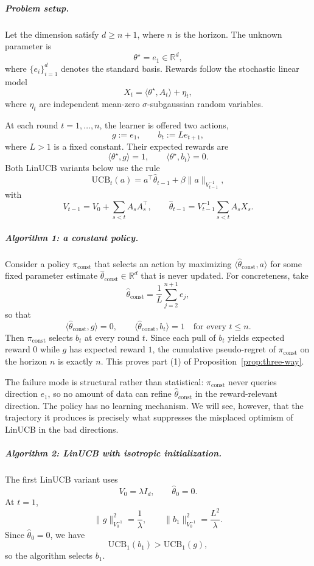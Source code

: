 \documentclass{article}
\theoremstyle{definition}
\theoremstyle{remark}
\theoremstyle{remark}
\begin{document}
\subparagraph{Problem setup.}
Let the dimension satisfy $d \ge n+1$, where $n$ is the horizon. The unknown parameter is
\[
\theta^\star = e_1 \in \mathbb{R}^d,
\]
where $\{e_i\}_{i=1}^d$ denotes the standard basis. Rewards follow the stochastic linear model
\[
X_t = \langle \theta^\star, A_t \rangle + \eta_t,
\]
where $\eta_t$ are independent mean-zero $\sigma$-subgaussian random variables.

At each round $t=1,\dots,n$, the learner is offered two actions,
\[
g:=e_1,
\qquad
b_t:=L e_{t+1},
\]
where $L>1$ is a fixed constant. Their expected rewards are
\[
\langle \theta^\star,g\rangle = 1,
\qquad
\langle \theta^\star,b_t\rangle = 0.
\]
Both LinUCB variants below use the rule
\[
\mathrm{UCB}_t(a)
=
a^\top \hat{\theta}_{t-1}
+
\beta \|a\|_{V_{t-1}^{-1}},
\]
with
\[
V_{t-1}=V_0+\sum_{s<t} A_sA_s^\top,
\qquad
\hat{\theta}_{t-1}
=
V_{t-1}^{-1}\sum_{s<t} A_s X_s.
\]

\subparagraph{Algorithm 1: a constant policy.}
Consider a policy $\pi_{\mathrm{const}}$ that selects an action by maximizing $\langle \hat{\theta}_{\mathrm{const}}, a\rangle$ for some fixed parameter estimate $\hat{\theta}_{\mathrm{const}}\in\mathbb{R}^d$ that is never updated. For concreteness, take
\[
\hat{\theta}_{\mathrm{const}}
=
\frac{1}{L}\sum_{j=2}^{n+1} e_j,
\]
so that
\[
\langle \hat{\theta}_{\mathrm{const}},g\rangle = 0,
\qquad
\langle \hat{\theta}_{\mathrm{const}},b_t\rangle = 1
\quad\text{for every } t\le n.
\]
Then $\pi_{\mathrm{const}}$ selects $b_t$ at every round $t$. Since each pull of $b_t$ yields expected reward $0$ while $g$ has expected reward $1$, the cumulative pseudo-regret of $\pi_{\mathrm{const}}$ on the horizon $n$ is exactly $n$. This proves part (1) of Proposition~\ref{prop:three-way}.

The failure mode is structural rather than statistical: $\pi_{\mathrm{const}}$ never queries direction $e_1$, so no amount of data can refine $\hat{\theta}_{\mathrm{const}}$ in the reward-relevant direction. The policy has no learning mechanism. We will see, however, that the trajectory it produces is precisely what suppresses the misplaced optimism of LinUCB in the bad directions.

\subparagraph{Algorithm 2: LinUCB with isotropic initialization.}
The first LinUCB variant uses
\[
V_0=\lambda I_d,
\qquad
\hat{\theta}_0=0.
\]
At $t=1$,
\[
\|g\|_{V_0^{-1}}^2=\frac{1}{\lambda},
\qquad
\|b_1\|_{V_0^{-1}}^2=\frac{L^2}{\lambda}.
\]
Since $\hat{\theta}_0=0$, we have
\[
\mathrm{UCB}_1(b_1)>\mathrm{UCB}_1(g),
\]
so the algorithm selects $b_1$.
\end{document}
